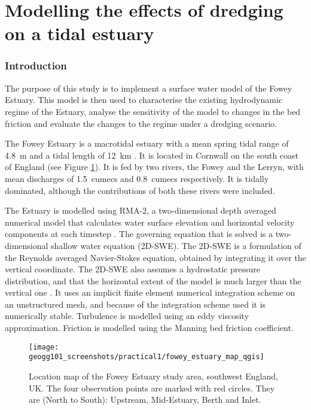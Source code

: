 \documentclass{article}
\begin{document}
\part*{Modelling the effects of dredging on a tidal estuary}

\section{Introduction}

The purpose of this study is to implement a surface water model of the Fowey Estuary. This model is then used to characterise the existing hydrodynamic regime of the Estuary, analyse the sensitivity of the model to changes in the bed friction and evaluate the changes to the regime under a dredging scenario. %

The Fowey Estuary is a macrotidal estuary with a mean spring tidal range of \SI{4.8}{\m} and a tidal length of \SI{12}{km} \parencite{uncles2002dependence}. It is located in Cornwall on the south coast of England (see Figure \ref{fig:fowey_estuary_map}). It is fed by two rivers, the Fowey and the Lerryn, with mean discharges of \SI{1.5}{cumecs} and \SI{0.8}{cumecs} respectively. It is tidally dominated, although the contributions of both these rivers were included.

The Estuary is modelled using RMA-2, a two-dimensional depth averaged numerical model that calculates water surface elevation and horizontal velocity components at each timestep \parencite{king1990program}.
The governing equation that is solved is a two-dimensional shallow water equation (2D-SWE). The 2D-SWE is a formulation of the Reynolds averaged Navier-Stokes equation, obtained by integrating it over the vertical coordinate. The 2D-SWE also assumes a hydrostatic pressure distribution, and that the horizontal extent of the model is much larger than the vertical one \parencite{cea2006numerical}.
It uses an implicit finite element numerical integration scheme on an unstructured mesh, and because of the integration scheme used it is numerically stable. Turbulence is modelled using an eddy viscosity approximation. Friction is modelled using the Manning bed friction coefficient.

\begin{figure}[hbp]
    \centering
    \texttt{[image: geogg101\_screenshots/practical1/fowey\_estuary\_map\_qgis]}
    \caption{Location map of the Fowey Estuary study area, southwest England, UK. The four observation points are marked with red circles. They are (North to South): Upstream, Mid-Estuary, Berth and Inlet. }
    \label{fig:fowey_estuary_map}
\end{figure}
\end{document}
